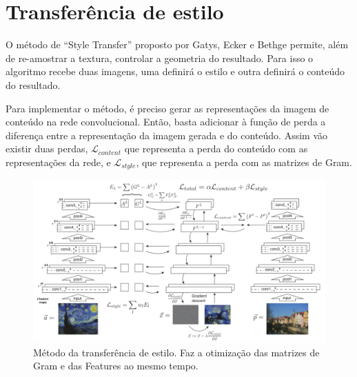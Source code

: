 \newpage
\section{Transferência de estilo} 

O método de ``Style Transfer'' proposto
por Gatys, Ecker e Bethge \cite{Gatys2016}
permite, além de re-amostrar a textura,
controlar a geometria do resultado.
Para isso o algoritmo recebe duas imagens,
uma definirá o estilo
e outra definirá o conteúdo do resultado.


Para implementar o método, é preciso
gerar as representações da imagem de
conteúdo na rede convolucional.
Então, basta adicionar
à função de perda a diferença entre
a representação da imagem gerada e do
conteúdo. Assim vão existir duas perdas,
$\mathcal{L}_{content}$ que representa
a perda do conteúdo com as representações
da rede, e $\mathcal{L}_{style}$, que
representa a perda com as matrizes de Gram.




\begin{figure}[!ht]
	\centering
	\includegraphics[width=\linewidth]{files/assets/articles/gatys3.png}
	\caption{Método da transferência de estilo. Faz a otimização
	das matrizes de Gram e das Features ao mesmo tempo.}
	\label{img:preview}
\end{figure}




\fi